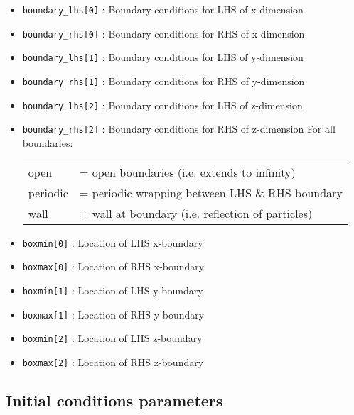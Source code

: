 \documentclass[a4paper]{article}
\newcommand{\var}[1]{\texttt{#1}}
\begin{document}
\begin{itemize}

\item \var{boundary\_lhs[0]} : Boundary conditions for LHS of x-dimension
\item \var{boundary\_rhs[0]} : Boundary conditions for RHS of x-dimension
\item \var{boundary\_lhs[1]} : Boundary conditions for LHS of y-dimension
\item \var{boundary\_rhs[1]} : Boundary conditions for RHS of y-dimension
\item \var{boundary\_lhs[2]} : Boundary conditions for LHS of z-dimension
\item \var{boundary\_rhs[2]} : Boundary conditions for RHS of z-dimension
For all boundaries: \\
\begin{tabular}{ll}
open     & = open boundaries (i.e. extends to infinity) \\
periodic & = periodic wrapping between LHS \& RHS boundary \\
wall     & = wall at boundary (i.e. reflection of particles)
\end{tabular}

\item \var{boxmin[0]} : Location of LHS x-boundary
\item \var{boxmax[0]} : Location of RHS x-boundary
\item \var{boxmin[1]} : Location of LHS y-boundary
\item \var{boxmax[1]} : Location of RHS y-boundary
\item \var{boxmin[2]} : Location of LHS z-boundary
\item \var{boxmax[2]} : Location of RHS z-boundary


\end{itemize}




\subsection{Initial conditions parameters}
\end{document}
